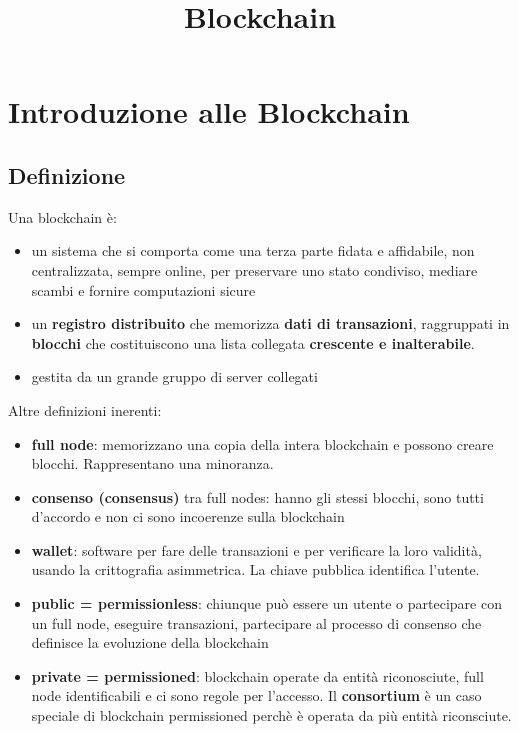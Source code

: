 \title{Blockchain}
\maketitle

\chapter{Introduzione alle Blockchain}

\section{Definizione}

Una blockchain è:
\begin{itemize}
    \item un sistema che si comporta come una terza parte fidata e affidabile, non centralizzata, sempre online, per preservare uno stato condiviso, mediare scambi e fornire computazioni sicure
    \item un \textbf{registro distribuito} che memorizza \textbf{dati di transazioni}, raggruppati in \textbf{blocchi} che costituiscono una lista collegata \textbf{crescente e inalterabile}.
    \item gestita da un grande gruppo di server collegati
\end{itemize}
Altre definizioni inerenti:
\begin{itemize}
    \item \textbf{full node}: memorizzano una copia della intera blockchain e possono creare blocchi. Rappresentano una minoranza.
    \item \textbf{consenso (consensus)} tra full nodes: hanno gli stessi blocchi, sono tutti d'accordo e non ci sono incoerenze sulla blockchain
    \item \textbf{wallet}: software per fare delle transazioni e per verificare la loro validità, usando la crittografia asimmetrica. La chiave pubblica identifica l'utente.
    \item \textbf{public = permissionless}: chiunque può essere un utente o partecipare con un full node, eseguire transazioni, partecipare al processo di consenso che definisce la evoluzione della blockchain
    \item \textbf{private = permissioned}: blockchain operate da entità riconosciute, full node identificabili e ci sono regole per l'accesso. Il \textbf{consortium} è un caso speciale di blockchain permissioned perchè è operata da più entità riconsciute. 
\end{itemize}

